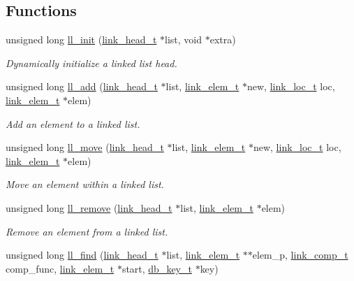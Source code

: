 \subsection*{Functions}
\begin{CompactItemize}
\item 
unsigned long \hyperlink{group__dbprim__link_a5}{ll\_\-init} (\hyperlink{dbprim_8h_a0}{link\_\-head\_\-t} $\ast$list, void $\ast$extra)
\begin{CompactList}\small\item\em Dynamically initialize a linked list head. \item\end{CompactList}\item 
unsigned long \hyperlink{group__dbprim__link_a6}{ll\_\-add} (\hyperlink{dbprim_8h_a0}{link\_\-head\_\-t} $\ast$list, \hyperlink{dbprim_8h_a1}{link\_\-elem\_\-t} $\ast$new, \hyperlink{dbprim_8h_a4}{link\_\-loc\_\-t} loc, \hyperlink{dbprim_8h_a1}{link\_\-elem\_\-t} $\ast$elem)
\begin{CompactList}\small\item\em Add an element to a linked list. \item\end{CompactList}\item 
unsigned long \hyperlink{group__dbprim__link_a7}{ll\_\-move} (\hyperlink{dbprim_8h_a0}{link\_\-head\_\-t} $\ast$list, \hyperlink{dbprim_8h_a1}{link\_\-elem\_\-t} $\ast$new, \hyperlink{dbprim_8h_a4}{link\_\-loc\_\-t} loc, \hyperlink{dbprim_8h_a1}{link\_\-elem\_\-t} $\ast$elem)
\begin{CompactList}\small\item\em Move an element within a linked list. \item\end{CompactList}\item 
unsigned long \hyperlink{group__dbprim__link_a8}{ll\_\-remove} (\hyperlink{dbprim_8h_a0}{link\_\-head\_\-t} $\ast$list, \hyperlink{dbprim_8h_a1}{link\_\-elem\_\-t} $\ast$elem)
\begin{CompactList}\small\item\em Remove an element from a linked list. \item\end{CompactList}\item 
unsigned long \hyperlink{group__dbprim__link_a9}{ll\_\-find} (\hyperlink{dbprim_8h_a0}{link\_\-head\_\-t} $\ast$list, \hyperlink{dbprim_8h_a1}{link\_\-elem\_\-t} $\ast$$\ast$elem\_\-p, \hyperlink{dbprim_8h_a3}{link\_\-comp\_\-t} comp\_\-func, \hyperlink{dbprim_8h_a1}{link\_\-elem\_\-t} $\ast$start, \hyperlink{dbprim_8h_a0}{db\_\-key\_\-t} $\ast$key)
$$
\end{CompactItemize}
